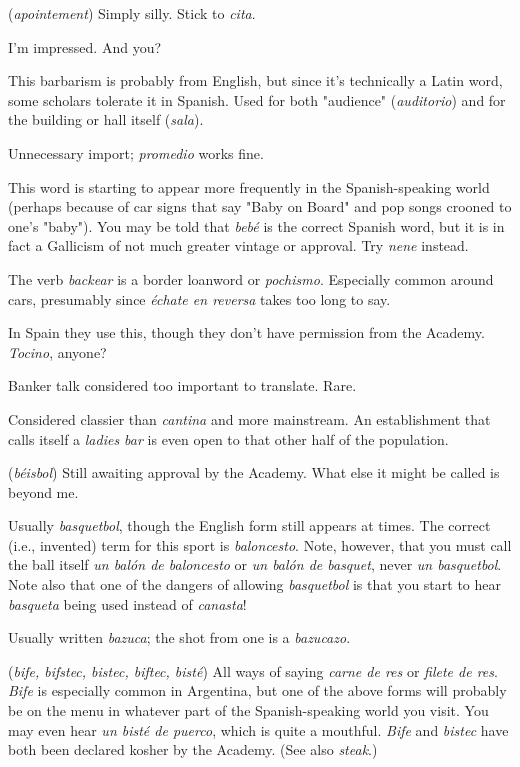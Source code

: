  (\emph{apointement}) Simply silly. Stick to \emph{cita}.

 I'm impressed. And you?

 This barbarism is probably from English, but
since it's technically a Latin word, some scholars tolerate it in Spanish. Used for both "audience" (\emph{auditorio}) and for the building or hall
itself (\emph{sala}).

 Unnecessary import; \emph{promedio} works fine.

 This word is starting to appear more frequently in the
Spanish-speaking world (perhaps because of car signs that say "Baby on
Board" and pop songs crooned to one's "baby"). You may be told that
\emph{bebé} is the correct Spanish word, but it is in fact a Gallicism of not
much greater vintage or approval. Try \emph{nene} instead.

 The verb \emph{backear} is a border loanword or \emph{pochismo}.
Especially common around cars, presumably since \emph{échate en reversa}
takes too long to say.

 In Spain they use this, though they don't have permission from the Academy. \emph{Tocino}, anyone?

 Banker talk considered too important to translate. Rare.

 Considered classier than \emph{cantina} and more mainstream.
An establishment that calls itself a \emph{ladies bar} is even open to that
other half of the population.

 (\emph{béisbol}) Still awaiting approval by the Academy.
What else it might be called is beyond me.

 Usually \emph{basquetbol}, though the English form
still appears at times. The correct (i.e., invented) term for this sport is
\emph{baloncesto}. Note, however, that you must call the ball itself \emph{un balón
de baloncesto} or \emph{un balón de basquet}, never \emph{un basquetbol}. Note also
that one of the dangers of allowing \emph{basquetbol} is that you start to hear
\emph{basqueta} being used instead of \emph{canasta}!

 Usually written \emph{bazuca}; the shot from one is a
\emph{bazucazo}.

 (\emph{bife, bifstec, bistec, biftec, bisté}) All ways of saying
\emph{carne de res} or \emph{filete de res}. \emph{Bife} is especially common in Argentina,
but one of the above forms will probably be on the menu in whatever
part of the Spanish-speaking world you visit. You may even hear \emph{un
bisté de puerco}, which is quite a mouthful. \emph{Bife} and \emph{bistec} have both
been declared kosher by the Academy. (See also \emph{steak}.)

